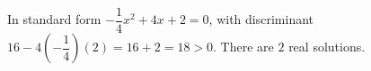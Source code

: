 In standard form $-\dfrac14x^2+4x+2=0$, with discriminant $16-4\left(-\dfrac14\right)(2)=16+2=18>0$. There are $\boxed{2}$ real solutions.
